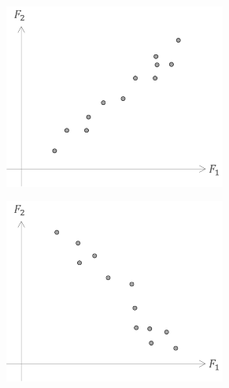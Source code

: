 \begin{figure}[H]
  \begin{subfigure}{0.3\textwidth}
    \centering
    \includegraphics[width=0.8\textwidth]{assets/visualization_and_extraction/feature_relation/scatter_pos_cor.png}
  \end{subfigure}\hspace*{0.025\textwidth}
  \begin{subfigure}{0.3\textwidth}
    \centering
    \includegraphics[width=0.8\textwidth]{assets/visualization_and_extraction/feature_relation/scatter_neg_cor.png}
  \end{subfigure}\hspace*{0.025\textwidth}
  \begin{subfigure}{0.3\textwidth}
    \centering

\end{subfigure}
\end{figure}
